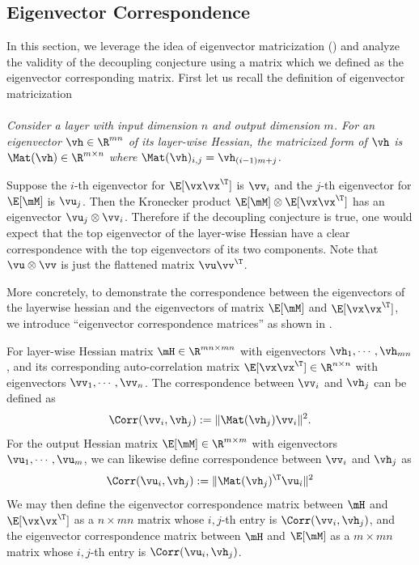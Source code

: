 \subsection{Eigenvector Correspondence}
\label{sec:app_exp_corr}

In this section, we leverage the idea of eigenvector matricization () and analyze the validity of the decoupling conjecture using a matrix which we defined as the eigenvector corresponding matrix. First let us recall the definition of eigenvector matricization

\paragraph{} \emph{Consider a layer with input dimension $n$ and output dimension $m$. For an eigenvector $\vh\in\R^{mn}$ of its layer-wise Hessian, the matricized form of $\vh$ is $\Mat(\vh)\in\R^{m\times n}$ where $\Mat(\vh)_{i,j} = \vh_{(i-1)m+j}$.}
\vspace{1em}

Suppose the $i$-th eigenvector for $\E[\vx\vx^\T]$ is $\vv_i$ and the $j$-th eigenvector for $\E[\mM]$ is $\vu_j$. Then the Kronecker product $\E[\mM]\otimes \E[\vx\vx^\T]$ has an eigenvector $\vu_j\otimes \vv_i$. Therefore if the decoupling conjecture is true, one would expect that the top eigenvector of the layer-wise Hessian have a clear correspondence with the top eigenvectors of its two components. Note that $\vu\otimes\vv$ is just the flattened matrix $\vu\vv^\T$.

More concretely, to demonstrate the correspondence between the eigenvectors of the layerwise hessian and the eigenvectors of matrix $\E[\mM]$ and $\E[\vx\vx^\T]$, we introduce ``eigenvector correspondence matrices'' as shown in .
\begin{definition}
For layer-wise Hessian matrix $\mH\in\R^{mn\times mn}$ with eigenvectors $\vh_1, \cdots, \vh_{mn}$, and its corresponding auto-correlation matrix $\E[\vx\vx^\T]\in\R^{n\times n}$ with eigenvectors $\vv_1, \cdots, \vv_n$. The correspondence between $\vv_i$ and $\vh_j$ can be defined as \begin{equation}
    \Corr(\vv_i,\vh_j) := \|\Mat(\vh_j)\vv_i\|^2.
\end{equation}
For the output Hessian matrix $\E[\mM]\in\R^{m\times m}$ with eigenvectors $\vu_1, \cdots, \vu_m$, we can likewise define correspondence between $\vv_i$ and $\vh_j$ as
\begin{equation}
    \Corr(\vu_i,\vh_j) := \|\Mat(\vh_j)^\T\vu_i\|^2
\end{equation}
We may then define the eigenvector correspondence matrix between $\mH$ and $\E[\vx\vx^\T]$ as a $n\times mn$ matrix whose $i,j$-th entry is $\Corr(\vv_i,\vh_j)$, and the eigenvector correspondence matrix between $\mH$ and $\E[\mM]$ as a $m\times mn$ matrix whose $i,j$-th entry is $\Corr(\vu_i,\vh_j)$.
\label{def:corr_mat}
\end{definition}

